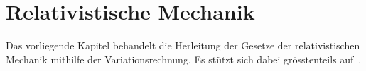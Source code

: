%
%
%
%
%

\chapter{Relativistische Mechanik\label{chapter:relativ}}
\begin{refsection}
%
%
%
%

\noindent
Das vorliegende Kapitel behandelt die Herleitung der Gesetze der relativistischen Mechanik
mithilfe der Variationsrechnung.
Es stützt sich dabei grösstenteils auf~\cite{relativ:landau}.






\printbibliography[heading=subbibliography]
\end{refsection}
